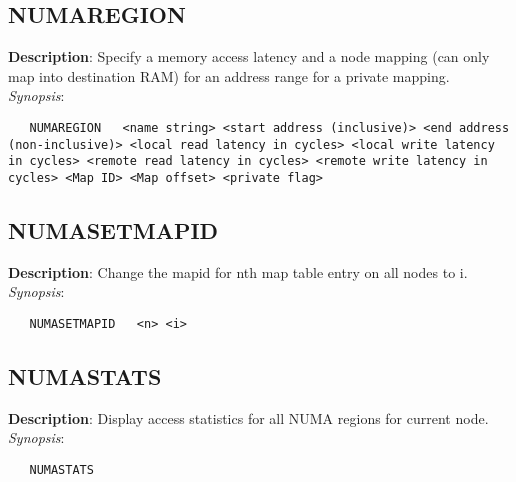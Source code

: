 \subsection{\bf NUMAREGION}
\label{manpages:NUMAREGION}
\label{manpages:numaregion}
\vspace{-0.2in}
{\bf Description}: 	Specify a memory access latency and a node mapping (can only map into destination RAM) for an address range for a private mapping.\\[1.5ex]
{\em Synopsis}:
\vspace{-0.2in}
\scriptsize
\begin{verbatim}
   NUMAREGION   <name string> <start address (inclusive)> <end address (non-inclusive)> <local read latency in cycles> <local write latency in cycles> <remote read latency in cycles> <remote write latency in cycles> <Map ID> <Map offset> <private flag>
\end{verbatim}
\normalsize
\vspace{-0.2in}


\subsection{\bf NUMASETMAPID}
\label{manpages:NUMASETMAPID}
\label{manpages:numasetmapid}
\vspace{-0.2in}
{\bf Description}: 	Change the mapid for nth map table entry on all nodes to i.\\[1.5ex]
{\em Synopsis}:
\vspace{-0.2in}
\scriptsize
\begin{verbatim}
   NUMASETMAPID   <n> <i> 
\end{verbatim}
\normalsize
\vspace{-0.2in}


\subsection{\bf NUMASTATS}
\label{manpages:NUMASTATS}
\label{manpages:numastats}
\vspace{-0.2in}
{\bf Description}: 	Display access statistics for all NUMA regions for current node.\\[1.5ex]
{\em Synopsis}:
\vspace{-0.2in}
\scriptsize
\begin{verbatim}
   NUMASTATS    
\end{verbatim}
\normalsize
\vspace{-0.2in}


